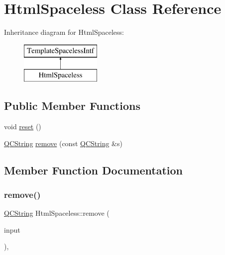 \hypertarget{class_html_spaceless}{}\section{Html\+Spaceless Class Reference}
\label{class_html_spaceless}
Inheritance diagram for Html\+Spaceless\+:\begin{figure}[H]
\begin{center}
\leavevmode
\includegraphics[height=2.000000cm]{class_html_spaceless}
\end{center}
\end{figure}
\subsection*{Public Member Functions}
\begin{DoxyCompactItemize}
\item 
void \mbox{\hyperlink{class_html_spaceless_af7774a1e0cda214f1d50e05dfb52be0b}{reset}} ()
\item 
\mbox{\hyperlink{class_q_c_string}{Q\+C\+String}} \mbox{\hyperlink{class_html_spaceless_ae0979dacb44f1a2db65f14f5bba84a7f}{remove}} (const \mbox{\hyperlink{class_q_c_string}{Q\+C\+String}} \&s)
\end{DoxyCompactItemize}


\subsection{Member Function Documentation}
\mbox{\label{class_html_spaceless_ae0979dacb44f1a2db65f14f5bba84a7f}} 
\subsubsection{\texorpdfstring{remove()}{remove()}}
{\footnotesize\ttfamily \mbox{\hyperlink{class_q_c_string}{Q\+C\+String}} Html\+Spaceless\+::remove (\begin{DoxyParamCaption}\item[{const \mbox{\hyperlink{class_q_c_string}{Q\+C\+String}} \&}]{input }\end{DoxyParamCaption})\hspace{0.3cm}{\ttfamily [inline]}, {\ttfamily [virtual]}}

